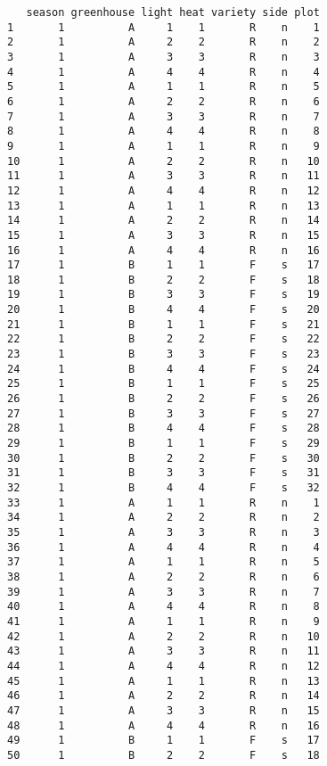 \documentclass[
  11pt,
  letterpaper,
  DIV=11,
  numbers=noendperiod]{scrartcl}
\begin{document}
\begin{verbatim}
   season greenhouse light heat variety side plot
1       1          A     1    1       R    n    1
2       1          A     2    2       R    n    2
3       1          A     3    3       R    n    3
4       1          A     4    4       R    n    4
5       1          A     1    1       R    n    5
6       1          A     2    2       R    n    6
7       1          A     3    3       R    n    7
8       1          A     4    4       R    n    8
9       1          A     1    1       R    n    9
10      1          A     2    2       R    n   10
11      1          A     3    3       R    n   11
12      1          A     4    4       R    n   12
13      1          A     1    1       R    n   13
14      1          A     2    2       R    n   14
15      1          A     3    3       R    n   15
16      1          A     4    4       R    n   16
17      1          B     1    1       F    s   17
18      1          B     2    2       F    s   18
19      1          B     3    3       F    s   19
20      1          B     4    4       F    s   20
21      1          B     1    1       F    s   21
22      1          B     2    2       F    s   22
23      1          B     3    3       F    s   23
24      1          B     4    4       F    s   24
25      1          B     1    1       F    s   25
26      1          B     2    2       F    s   26
27      1          B     3    3       F    s   27
28      1          B     4    4       F    s   28
29      1          B     1    1       F    s   29
30      1          B     2    2       F    s   30
31      1          B     3    3       F    s   31
32      1          B     4    4       F    s   32
33      1          A     1    1       R    n    1
34      1          A     2    2       R    n    2
35      1          A     3    3       R    n    3
36      1          A     4    4       R    n    4
37      1          A     1    1       R    n    5
38      1          A     2    2       R    n    6
39      1          A     3    3       R    n    7
40      1          A     4    4       R    n    8
41      1          A     1    1       R    n    9
42      1          A     2    2       R    n   10
43      1          A     3    3       R    n   11
44      1          A     4    4       R    n   12
45      1          A     1    1       R    n   13
46      1          A     2    2       R    n   14
47      1          A     3    3       R    n   15
48      1          A     4    4       R    n   16
49      1          B     1    1       F    s   17
50      1          B     2    2       F    s   18

\end{verbatim}
\end{document}
